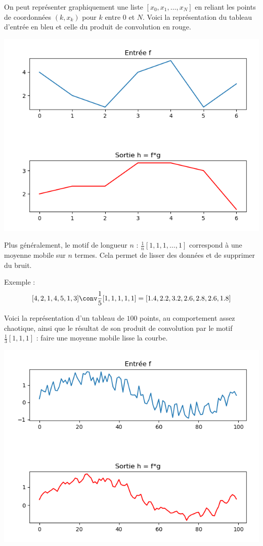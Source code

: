 \documentclass[11pt,class=report,crop=false]{standalone}
\begin{document}
On peut représenter graphiquement une liste $[x_0,x_1,\ldots,x_N]$ en reliant les points de coordonnées $(k,x_k)$ pour $k$ entre $0$ et $N$. Voici la représentation du tableau d'entrée en bleu et celle du produit de convolution en rouge.
\begin{center}
\includegraphics[scale=\myscale,scale=0.6]{figures/convolution-1d-1}
\end{center}

Plus généralement, le motif de longueur $n$ : $\frac1n[1,1,1,\ldots,1]$ correspond à une moyenne mobile sur $n$ termes. Cela permet de \og{}lisser\fg{} des données et de supprimer du \og{}bruit\fg{}.

Exemple :
$$[4, 2, 1, 4, 5, 1, 3] \conv \frac15[1,1,1,1,1] = [1.4, 2.2, 3.2, 2.6, 2.8, 2.6, 1.8]$$


\bigskip

Voici la représentation d'un tableau de $100$ points, au comportement assez chaotique, ainsi que le résultat de son produit de convolution par le motif $\frac13[1,1,1]$ : faire une moyenne mobile \og{}lisse\fg{} la courbe.
 
\begin{center}
\includegraphics[scale=\myscale,scale=0.6]{figures/convolution-1d-2}
\end{center}
\end{document}
